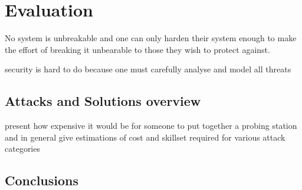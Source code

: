 \section{Evaluation}
\label{sec:conclusion}
No system is unbreakable and one can only harden their system enough to make the effort of breaking it unbearable to those they wish to protect against\citep{anderson:cautionary_note}\cite{sergei:thesis}.

security is hard to do because one must carefully analyse and model all threats \citep{kocher:DPA}
	\subsection{Attacks and Solutions overview}
	present how expensive it would be for someone to put together a probing station and in general give estimations of cost  and skillset required for various attack categories
	\subsection{Conclusions}